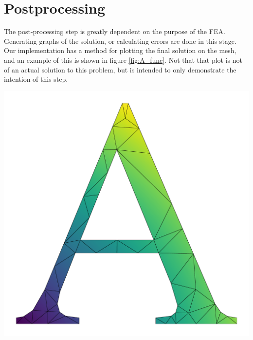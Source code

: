 \documentclass[../fem.tex]{subfiles}
\begin{document}
\section{Postprocessing}%
\label{sec:postprocessing}

The post-processing step is greatly dependent on the purpose of the FEA.
Generating graphs of the solution, or calculating errors are done in this
stage. Our implementation has a method for plotting the final solution on the
mesh, and an example of this is shown in figure \ref{fig:A_func}. Not that that
plot is not of an actual solution to this problem, but is intended to only
demonstrate the intention of this step.

\begin{Figure}
   \begin{center}
     \includegraphics[width=0.8\linewidth]{a_func.png}
   \end{center}
   \label{fig:A_func}
\end{Figure}
\end{document}
